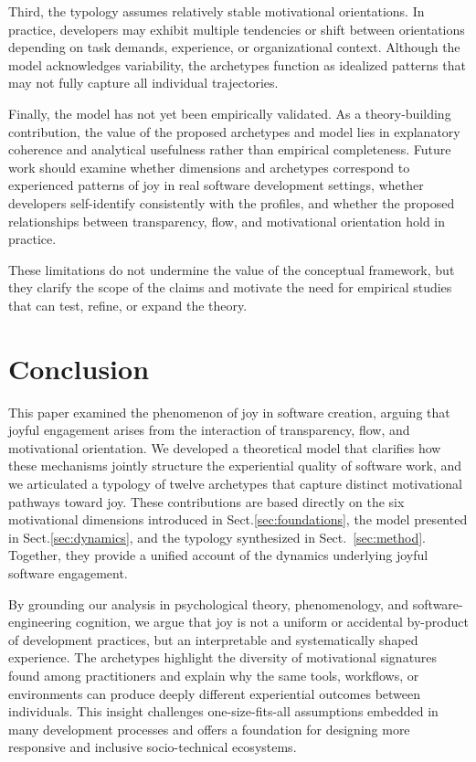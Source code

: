 \documentclass[12pt]{elsarticle}
\begin{document}
Third, the typology assumes relatively stable motivational orientations. In practice, developers may exhibit multiple tendencies or shift between orientations depending on task demands, experience, or organizational context. Although the model acknowledges variability, the archetypes function as idealized patterns that may not fully capture all individual trajectories.

Finally, the model has not yet been empirically validated. As a theory-building
contribution, the value of the proposed archetypes and model lies in explanatory
coherence and analytical usefulness rather than empirical completeness. Future
work should examine whether dimensions and archetypes correspond to
experienced patterns of joy in real software development settings, whether
developers self-identify consistently with the profiles, and whether the
proposed relationships between transparency, flow, and motivational orientation
hold in practice.

These limitations do not undermine the value of the conceptual framework, but they clarify the scope of the claims and motivate the need for empirical studies that can test, refine, or expand the theory.

\section{Conclusion}\label{sec:conclusion}
This paper examined the phenomenon of joy in software creation, arguing that
joyful engagement arises from the interaction of transparency, flow, and
motivational orientation. We developed a theoretical model that clarifies how
these mechanisms jointly structure the experiential quality of software work,
and we articulated a typology of twelve archetypes that capture distinct
motivational pathways toward joy. These contributions are based directly on the
six motivational dimensions introduced in Sect.\ref{sec:foundations}, the model
presented in Sect.\ref{sec:dynamics}, and the typology synthesized in
Sect.~\ref{sec:method}. Together, they provide a unified account of the
dynamics underlying joyful software engagement.

By grounding our analysis in psychological theory, phenomenology, and
software-engineering cognition, we argue that joy is not a uniform or accidental by-product
of development practices, but an interpretable and
systematically shaped experience. The archetypes highlight the diversity of
motivational signatures found among practitioners and explain why the same
tools, workflows, or environments can produce deeply different experiential
outcomes between individuals. This insight challenges one-size-fits-all
assumptions embedded in many development processes and offers a foundation for
designing more responsive and inclusive socio-technical ecosystems.
\end{document}
